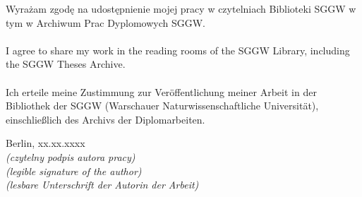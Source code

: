 \newpage

\thispagestyle{empty}

\noindent
Wyrażam zgodę na udostępnienie mojej pracy w czytelniach Biblioteki SGGW w tym w Archiwum Prac Dyplomowych SGGW.
\\ \\
I agree to share my work in the reading rooms of the SGGW Library, including the SGGW Theses Archive.
\\ \\
Ich erteile meine Zustimmung zur Veröffentlichung meiner Arbeit in der Bibliothek der SGGW (Warschauer Naturwissenschaftliche Universität), einschließlich des Archivs der Diplomarbeiten.
\vspace{2cm}

\noindent
\begin{minipage}[t]{0.45\textwidth}
\end{minipage}%
\hfill
\begin{minipage}[t]{0.5\textwidth}
Berlin, xx.xx.xxxx %
\makebox[\linewidth]{\dotfill}\\
\textit{(czytelny podpis autora pracy)}\\
\textit{(legible signature of the author)}\\
\textit{(lesbare Unterschrift der Autorin der Arbeit)}
\end{minipage}